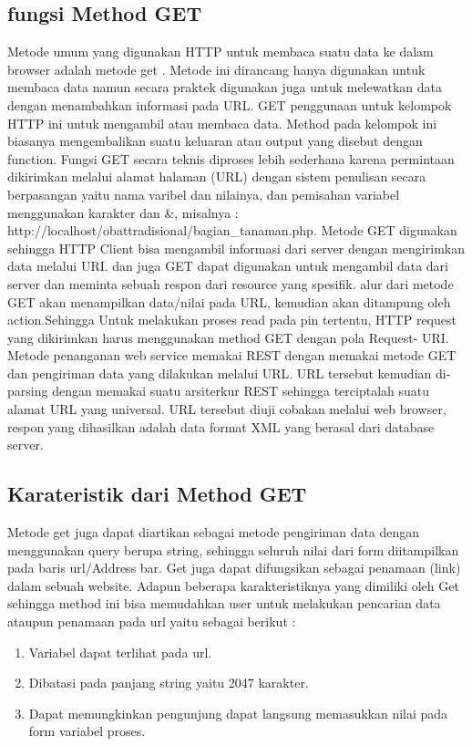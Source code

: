 \subsection{fungsi Method GET}
Metode umum yang digunakan HTTP untuk membaca suatu data ke dalam browser adalah metode get . Metode ini dirancang hanya 
digunakan untuk membaca data namun secara praktek digunakan juga untuk melewatkan data dengan menambahkan informasi pada URL. 
GET penggunaan untuk kelompok HTTP ini untuk mengambil atau membaca data. Method pada kelompok ini biasanya mengembalikan suatu 
keluaran atau output yang  disebut dengan function.
Fungsi GET secara teknis diproses lebih sederhana karena permintaan dikirimkan melalui alamat halaman (URL) dengan sistem 
penulisan secara berpasangan yaitu nama varibel dan nilainya, dan pemisahan variabel menggunakan karakter dan &, misalnya :
http://localhost/obattradisional/bagian_tanaman.php. Metode GET digunakan sehingga HTTP Client bisa mengambil informasi dari 
server dengan mengirimkan data melalui URI.
dan juga GET dapat digunakan untuk mengambil data dari server dan meminta sebuah respon dari resource yang spesifik.  alur dari 
metode GET akan menampilkan data/nilai pada URL, kemudian akan ditampung oleh action.Sehingga Untuk melakukan proses read pada 
pin tertentu, HTTP request yang dikirimkan harus menggunakan method GET dengan pola Request- URI.
Metode penanganan web service memakai REST dengan memakai metode GET dan pengiriman data yang dilakukan melalui URL. URL 
tersebut kemudian di-parsing dengan memakai suatu arsiterkur REST sehingga terciptalah suatu alamat URL yang universal. URL 
tersebut diuji cobakan melalui web browser, respon yang dihasilkan adalah data format XML yang berasal dari database server. 


\subsection{Karateristik dari Method GET}
Metode get juga dapat diartikan sebagai metode pengiriman data dengan menggunakan query berupa string, sehingga seluruh nilai dari form 
diitampilkan pada baris url/Address bar. Get juga dapat difungsikan sebagai penamaan (link) dalam sebuah website. Adapun beberapa 
karakteristiknya yang dimiliki oleh Get sehingga method ini bisa memudahkan user untuk melakukan pencarian data ataupun penamaan pada 
url yaitu sebagai berikut :
\begin{enumerate}
\item Variabel dapat terlihat pada url.
\item Dibatasi pada panjang string yaitu 2047 karakter.
\item Dapat memungkinkan pengunjung dapat langsung memasukkan nilai pada form variabel proses.
\end{enumerate}

